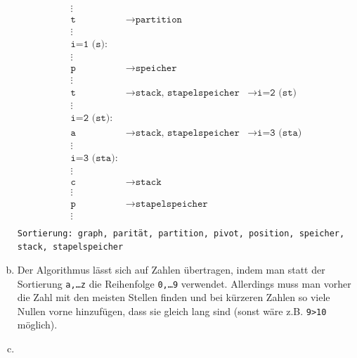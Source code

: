 \documentclass[11pt]{article}
\begin{document}
\begin{enumerate}[a)]
\begin{align*}
        \vdots & & \\ 
        \texttt{t} & \rightarrow \texttt{partition} & \\ 
        \vdots & & \\ 
        \texttt{i=1 (s):} & & \\ 
        \vdots & & \\ 
        \texttt{p} & \rightarrow \texttt{speicher} & \\ 
        \vdots & & \\ 
        \texttt{t} & \rightarrow \texttt{stack, stapelspeicher} & \rightarrow
          \texttt{i=2 (st)} \\ 
        \vdots & & \\ 
        \texttt{i=2 (st):} & & \\ 
        \texttt{a} & \rightarrow \texttt{stack, stapelspeicher} & \rightarrow
          \texttt{i=3 (sta)} \\ 
        \vdots & & \\ 
        \texttt{i=3 (sta):} & & \\
        \vdots & & \\ 
        \texttt{c} & \rightarrow \texttt{stack} & \\ 
        \vdots & & \\ 
        \texttt{p} & \rightarrow \texttt{stapelspeicher} & \\ 
        \vdots & & \\ 
      \end{align*}
      \texttt{Sortierung: graph, parität, partition, pivot, position, speicher,
        stack, stapelspeicher}
    \item 
      Der Algorithmus lässt sich auf Zahlen übertragen, indem man statt der
      Sortierung \texttt{a,\dots z} die Reihenfolge \texttt{0,\dots 9}
      verwendet. Allerdings muss man vorher die Zahl mit den meisten Stellen
      finden und bei kürzeren Zahlen so viele Nullen vorne hinzufügen, dass sie
      gleich lang sind (sonst wäre z.B. \texttt{9>10} möglich).
    \item 
  \end{enumerate}
\end{document}
